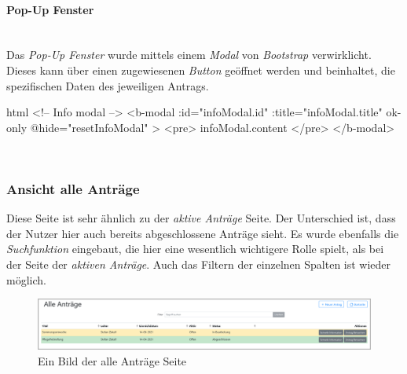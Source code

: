 \paragraph{Pop-Up Fenster}
~\\
Das \textit{Pop-Up Fenster} wurde mittels einem \textit{Modal} von \textit{Bootstrap} verwirklicht. Dieses kann über einen zugewiesenen \textit{Button} geöffnet werden und beinhaltet, die spezifischen Daten des jeweiligen Antrags.
\begin{code}{html}
	<!-- Info modal -->
    <b-modal
      :id="infoModal.id"
      :title="infoModal.title"
      ok-only
      @hide="resetInfoModal"
    >
      <pre>{{ infoModal.content }}</pre>
    </b-modal>
\end{code}
	\label{list:codepopup} ~\\

\subsubsection{Ansicht alle Anträge}
\label{chapter:implementierung-frontend-komponenten-alle}
Diese Seite ist sehr ähnlich zu der \textit{aktive Anträge} Seite. Der Unterschied ist, dass der Nutzer hier auch bereits abgeschlossene Anträge sieht. Es wurde ebenfalls die \textit{Suchfunktion} eingebaut, die hier eine wesentlich wichtigere Rolle spielt, als bei der Seite der \textit{aktiven Anträge}. Auch das Filtern der einzelnen Spalten ist wieder möglich.
\begin{figure}[H]
	\centering
	\includegraphics[width=1\linewidth]{images/ldehner_implementierung/alle}
	\caption[Alle Anträge Seite]{Ein Bild der alle Anträge Seite}
	\label{fig:antragalle}
\end{figure}
~\\

\newpage
